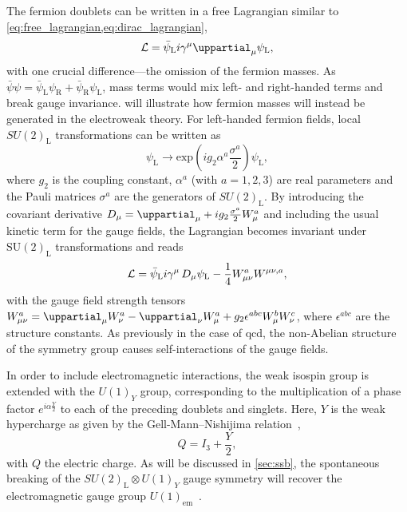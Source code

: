 The fermion doublets can be written in a free Lagrangian similar to \cref{eq:free_lagrangian,eq:dirac_lagrangian},
\begin{equation}
	\Lagr = \bar{\psi}_\mathrm{L}i\gamma^\mu\uppartial_\mu\psi_\mathrm{L},
\end{equation}
with one crucial difference---the omission of the fermion masses. As $\bar{\psi}\psi = \bar{\psi}_\mathrm{L}\psi_\mathrm{R} + \bar{\psi}_\mathrm{R}\psi_\mathrm{L}$, mass terms would mix left- and right-handed terms and break gauge invariance.  will illustrate how fermion masses will instead be generated in the electroweak theory. For left-handed fermion fields, local $SU(2)_\mathrm{L}$ transformations can be written as
\begin{equation}
	\psi_\mathrm{L} \rightarrow \mathrm{exp}\left(ig_2\alpha^a\frac{\sigma^a}{2}\right)\psi_\mathrm{L},
\end{equation}  
where $g_2$ is the coupling constant, $\alpha^a$ (with $a=1,2,3$) are real parameters and the Pauli matrices $\sigma^a$ are the generators of $SU(2)_\mathrm{L}$. By introducing the covariant derivative $\codiff_\mu = \uppartial_\mu + ig_2\frac{\sigma^a}{2}W^a_\mu$ and including the usual kinetic term for the gauge fields, the Lagrangian becomes invariant under $\mathrm{SU}(2)_\mathrm{L}$ transformations and reads
\begin{equation}
	\mathcal{L} = \bar{\psi}_\mathrm{L}i\gamma^\mu\mathop{}\!D_\mu\psi_\mathrm{L} - \frac{1}{4}W^a_{\mu\nu}W^{\mu\nu,a},
\end{equation}
with the gauge field strength tensors $W^a_{\mu\nu} = \uppartial_\mu W^a_\nu - \uppartial_\nu W^a_\mu + g_2 \epsilon^{abc}W^b_\mu W^c_\nu$, where $\epsilon^{abc}$ are the structure constants. As previously in the case of \gls{qcd}, the non-Abelian structure of the symmetry group causes self-interactions of the gauge fields.

In order to include electromagnetic interactions, the weak isospin group is extended with the $U(1)_Y$ group, corresponding to the multiplication of a phase factor $e^{i\alpha\frac{Y}{2}}$ to each of the preceding doublets and singlets. Here, $Y$ is the weak hypercharge as given by the Gell-Mann--Nishijima relation~\cite{Gell-Mann1956,10.1143/PTP.13.285,10.1143/PTP.10.581},
\begin{equation}
	Q = I_3 + \frac{Y}{2},
	\label{eq:gell-mann-nishijima}
\end{equation}
with $Q$ the electric charge.
As will be discussed in \cref{sec:ssb}, the spontaneous breaking of the \mbox{$SU(2)_\mathrm{L}\otimes U(1)_Y$} gauge symmetry will recover the electromagnetic gauge group $U(1)_\mathrm{em}$~\cite{Peskin:1995ev}.

